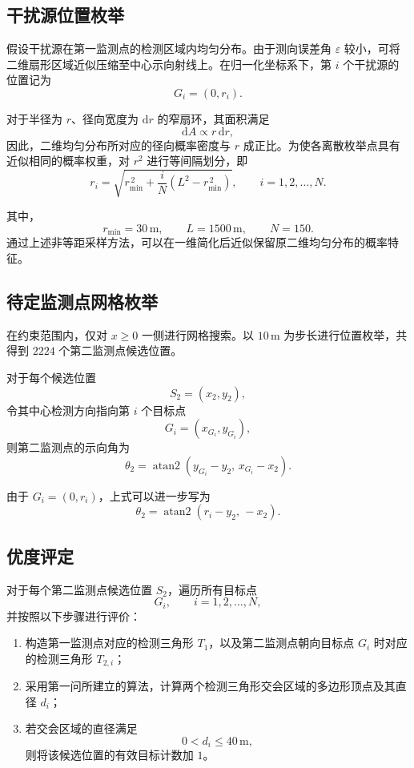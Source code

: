 \documentclass[withoutpreface,bwprint]{cumcmthesis}
\begin{document}
\subsection{干扰源位置枚举}
假设干扰源在第一监测点的检测区域内均匀分布。由于测向误差角 $\varepsilon$ 较小，可将二维扇形区域近似压缩至中心示向射线上。在归一化坐标系下，第 $i$ 个干扰源的位置记为
\[
G_i=(0,r_i).
\]

对于半径为 $r$、径向宽度为 $\mathrm{d}r$ 的窄扇环，其面积满足
\[
\mathrm{d}A\propto r\,\mathrm{d}r,
\]
因此，二维均匀分布所对应的径向概率密度与 $r$ 成正比。为使各离散枚举点具有近似相同的概率权重，对 $r^2$ 进行等间隔划分，即
\[
r_i=
\sqrt{
r_{\min}^{\,2}
+
\frac{i}{N}
\left(
L^2-r_{\min}^{\,2}
\right)
},
\qquad i=1,2,\ldots,N.
\]

其中，
\[
r_{\min}=30\,\mathrm{m},
\qquad
L=1500\,\mathrm{m},
\qquad
N=150.
\]
通过上述非等距采样方法，可以在一维简化后近似保留原二维均匀分布的概率特征。
\subsection{待定监测点网格枚举}
在约束范围内，仅对 $x\geq 0$ 一侧进行网格搜索。以 $10\,\mathrm{m}$ 为步长进行位置枚举，共得到 $2224$ 个第二监测点候选位置。

对于每个候选位置
\[
S_2=(x_2,y_2),
\]
令其中心检测方向指向第 $i$ 个目标点
\[
G_i=(x_{G_i},y_{G_i}),
\]
则第二监测点的示向角为
\[
\theta_2
=
\operatorname{atan2}
\left(
y_{G_i}-y_2,\,
x_{G_i}-x_2
\right).
\]

由于 $G_i=(0,r_i)$，上式可以进一步写为
\[
\theta_2
=
\operatorname{atan2}
\left(
r_i-y_2,\,
-x_2
\right).
\]
\subsection{优度评定}

对于每个第二监测点候选位置 $S_2$，遍历所有目标点
\[
G_i,\qquad i=1,2,\ldots,N,
\]
并按照以下步骤进行评价：

\begin{enumerate}
    \item 构造第一监测点对应的检测三角形 $T_1$，以及第二监测点朝向目标点 $G_i$ 时对应的检测三角形 $T_{2,i}$；
    
    \item 采用第一问所建立的算法，计算两个检测三角形交会区域的多边形顶点及其直径 $d_i$；
    
    \item 若交会区域的直径满足
    \[
    0<d_i\leq 40\,\mathrm{m},
    \]
    则将该候选位置的有效目标计数加 $1$。
\end{enumerate}
\end{document}
